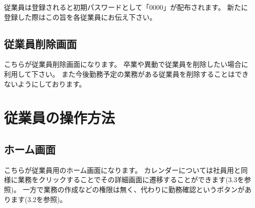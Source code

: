 \documentclass[11pt, a4paper]{jarticle}
\begin{document}
		従業員は登録されると初期パスワードとして「0000」が配布されます。
		新たに登録した際はこの旨を各従業員にお伝え下さい。


	\subsection{従業員削除画面}
		\begin{figure}[htbp]
			\centering
		\end{figure}
		こちらが従業員削除画面になります。
		卒業や異動で従業員を削除したい場合に利用して下さい。
		また今後勤務予定の業務がある従業員を削除することはできないようにしております。
	\clearpage


\section{従業員の操作方法}
	\subsection{ホーム画面}
		\begin{figure}[htbp]
			\centering
		\end{figure}
		こちらが従業員用のホーム画面になります。
		カレンダーについては社員用と同様に業務をクリックすることでその詳細画面に遷移することができます(3.3を参照)。
		一方で業務の作成などの権限は無く、代わりに勤務確認というボタンがあります(3.2を参照)。
\end{document}
